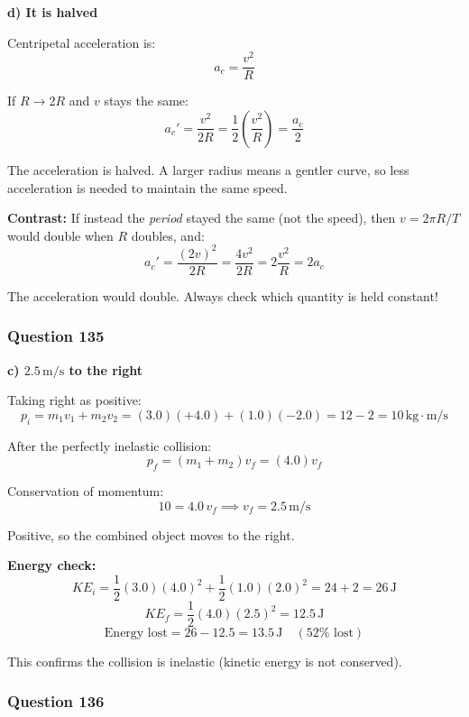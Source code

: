 \documentclass[12pt,letterpaper]{article}
\begin{document}
\begin{answerbox}
\textbf{d) It is halved}
\end{answerbox}

\begin{explanationbox}
Centripetal acceleration is:
\[
a_c = \frac{v^2}{R}
\]

If $R \to 2R$ and $v$ stays the same:
\[
a_c' = \frac{v^2}{2R} = \frac{1}{2}\left(\frac{v^2}{R}\right) = \frac{a_c}{2}
\]

The acceleration is halved. A larger radius means a gentler curve, so less acceleration is needed to maintain the same speed.

\textbf{Contrast:} If instead the \emph{period} stayed the same (not the speed), then $v = 2\pi R/T$ would double when $R$ doubles, and:
\[
a_c' = \frac{(2v)^2}{2R} = \frac{4v^2}{2R} = 2\frac{v^2}{R} = 2a_c
\]

The acceleration would double. Always check which quantity is held constant!
\end{explanationbox}

\subsubsection*{Question 135}

\begin{answerbox}
\textbf{c) $2.5\,\text{m/s}$ to the right}
\end{answerbox}

\begin{explanationbox}
Taking right as positive:
\[
p_i = m_1 v_1 + m_2 v_2 = (3.0)(+4.0) + (1.0)(-2.0) = 12 - 2 = 10\,\text{kg}\cdot\text{m/s}
\]

After the perfectly inelastic collision:
\[
p_f = (m_1 + m_2)v_f = (4.0)v_f
\]

Conservation of momentum:
\[
10 = 4.0\,v_f \implies v_f = 2.5\,\text{m/s}
\]

Positive, so the combined object moves to the right.

\textbf{Energy check:}
\[
KE_i = \frac{1}{2}(3.0)(4.0)^2 + \frac{1}{2}(1.0)(2.0)^2 = 24 + 2 = 26\,\text{J}
\]
\[
KE_f = \frac{1}{2}(4.0)(2.5)^2 = 12.5\,\text{J}
\]
\[
\text{Energy lost} = 26 - 12.5 = 13.5\,\text{J} \quad (52\%\text{ lost})
\]

This confirms the collision is inelastic (kinetic energy is not conserved).
\end{explanationbox}

\subsubsection*{Question 136}
\end{document}
